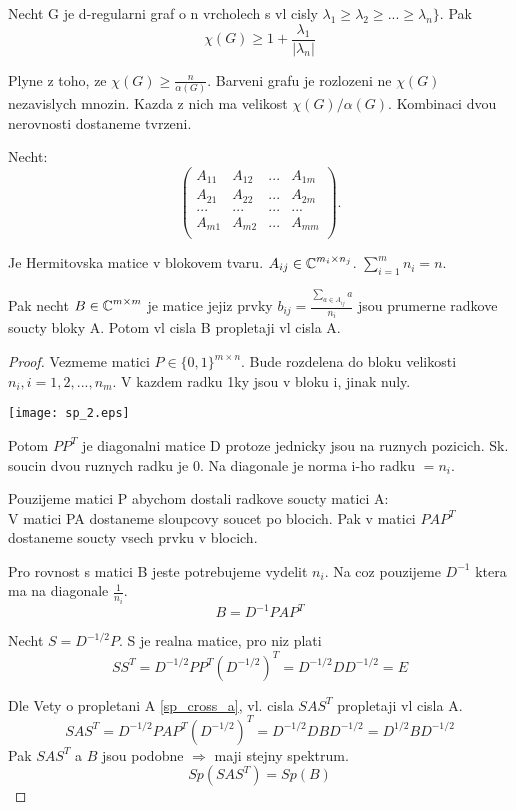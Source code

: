 \begin{consequence}
	Necht G je d-regularni graf o n vrcholech s vl cisly $\lambda_1 \geq \lambda_2 \geq ... \geq \lambda_n \}$. Pak
	\[ \chi(G) \geq 1 + \frac{\lambda_1}{|\lambda_n|} \]

	Plyne z toho, ze $ \chi(G) \geq \frac{n}{\alpha(G)}$. Barveni grafu je rozlozeni ne $\chi(G)$ nezavislych mnozin. Kazda z nich ma velikost $\chi(G)/\alpha(G)$. Kombinaci dvou nerovnosti dostaneme tvrzeni.
\end{consequence}

\begin{theorem}[Propletani B]\label{sp_cross_b}
	Necht:
	\[
	\begin{pmatrix}
		A_{11} & A_{12} & ... & A_{1m}\\
		A_{21} & A_{22} & ... & A_{2m}\\
		... & ... & ... & ... \\
		A_{m1} & A_{m2} & ... & A_{mm}\\
	\end{pmatrix}.
\]

	Je Hermitovska matice v blokovem tvaru. $A_{ij} \in \operatorname{\mathbb{C}}^{m_i \times n_j}$.
	$\sum_{i=1}^m n_i = n$.

	Pak necht $B \in \operatorname{\mathbb{C}}^{m \times m}$ je matice jejiz prvky $b_{ij} = \frac{\sum_{a \in A_{ij}} a}{n_i} $ jsou prumerne radkove soucty bloky A.
	Potom vl cisla B propletaji vl cisla A.
\end{theorem}
\begin{proof}
	Vezmeme matici $P \in \{0, 1\}^{m \times n}$. Bude rozdelena do bloku velikosti $n_i, i = 1,2,...,n_m$.
	V kazdem radku 1ky jsou v bloku i, jinak nuly.

	\texttt{[image: sp\_2.eps]}

	Potom $PP^T$ je diagonalni matice D protoze jednicky jsou na ruznych pozicich. Sk. soucin dvou ruznych radku je 0.
	Na diagonale je norma i-ho radku $= n_i$.

	Pouzijeme matici P abychom dostali radkove soucty matici A:\\
	V matici PA dostaneme sloupcovy soucet po blocich. Pak v matici $PAP^T$ dostaneme soucty vsech prvku v blocich.

	Pro rovnost s matici B jeste potrebujeme vydelit $n_i$. Na coz pouzijeme $D^{-1}$ ktera ma na diagonale $\frac{1}{n_i}$.
	\[ B = D^{-1}PAP^T \]

	Necht $S = D^{-1/2}P$. S je realna matice, pro niz plati
	\[ SS^T = D^{-1/2}PP^T(D^{-1/2})^T = D^{-1/2}DD^{-1/2} = E \]

	Dle Vety o propletani A \cref{sp_cross_a}, vl. cisla $SAS^T$ propletaji vl cisla A.
	\[ SAS^T = D^{-1/2}PAP^T(D^{-1/2})^T = D^{-1/2}DBD^{-1/2} = D^{1/2}BD^{-1/2} \]
	Pak $SAS^T$ a $B$ jsou podobne $\Rightarrow$ maji stejny spektrum.
	\[ Sp(SAS^T) = Sp(B) \]
\end{proof}

